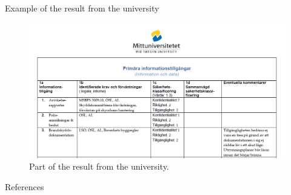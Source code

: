 \documentclass{beamer}
\begin{document}
\begin{frame}{Example of the result from the university}
  \begin{figure}
    \includegraphics[width=\textwidth]{Figures/miun-klassresultat.png}
    \caption{Part of the result from the university.}
  \end{figure}
\end{frame}




\begin{frame}[allowframebreaks]{References}
	\small
  \printbibliography{}
\end{frame}
\end{document}
